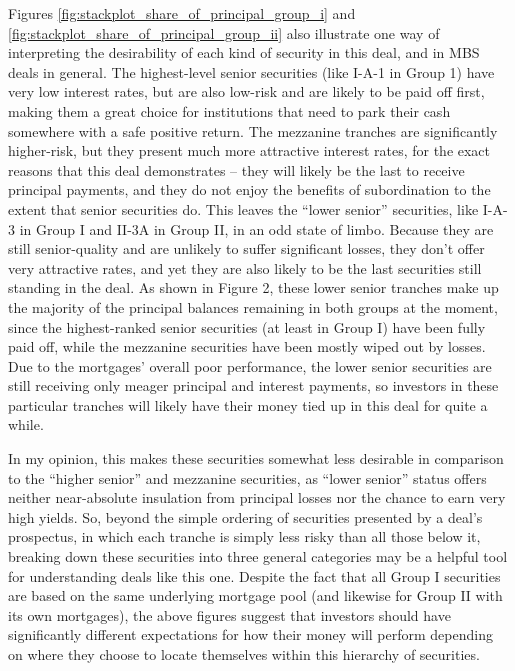 \documentclass[12pt]{article}
\begin{document}
Figures \ref{fig:stackplot_share_of_principal_group_i} and \ref{fig:stackplot_share_of_principal_group_ii} also illustrate one way of interpreting the desirability of each kind of security in this deal, and in MBS deals in general. The highest-level senior securities (like I-A-1 in Group 1) have very low interest rates, but are also low-risk and are likely to be paid off first, making them a great choice for institutions that need to park their cash somewhere with a safe positive return. The mezzanine tranches are significantly higher-risk, but they present much more attractive interest rates, for the exact reasons that this deal demonstrates – they will likely be the last to receive principal payments, and they do not enjoy the benefits of subordination to the extent that senior securities do. This leaves the “lower senior” securities, like I-A-3 in Group I and II-3A in Group II, in an odd state of limbo. Because they are still senior-quality and are unlikely to suffer significant losses, they don’t offer very attractive rates, and yet they are also likely to be the last securities still standing in the deal. As shown in Figure 2, these lower senior tranches make up the majority of the principal balances remaining in both groups at the moment, since the highest-ranked senior securities (at least in Group I) have been fully paid off, while the mezzanine securities have been mostly wiped out by losses. Due to the mortgages’ overall poor performance, the lower senior securities are still receiving only meager principal and interest payments, so investors in these particular tranches will likely have their money tied up in this deal for quite a while.

In my opinion, this makes these securities somewhat less desirable in comparison to the ``higher senior'' and mezzanine securities, as “lower senior” status offers neither near-absolute insulation from principal losses nor the chance to earn very high yields. So, beyond the simple ordering of securities presented by a deal’s prospectus, in which each tranche is simply less risky than all those below it, breaking down these securities into three general categories may be a helpful tool for understanding deals like this one. Despite the fact that all Group I securities are based on the same underlying mortgage pool (and likewise for Group II with its own mortgages), the above figures suggest that investors should have significantly different expectations for how their money will perform depending on where they choose to locate themselves within this hierarchy of securities.
\end{document}
